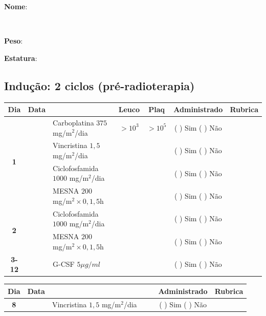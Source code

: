 \documentclass[11pt,a4paper,oldfontcommands]{memoir}
\def\entrywithlabel[#1]#2{\parbox{#1}{{\small #2:} \hrulefill}}
\begin{document}
\pagebreak
    \noindent
\entrywithlabel[1\hsize]{\textbf{Nome}}\hfill
\\[0.3cm]
\entrywithlabel[.45\hsize]{\textbf{Peso}}\hfill  \entrywithlabel[.45\hsize]{\textbf{Estatura}}

\subsection{Indução: 2 ciclos (pré-radioterapia)}
\renewcommand{\arraystretch}{1.5}

\begin{center}
\begin{table}[H]
\begin{tabular}{p{1cm}c|p{5cm}|p{1.5cm}p{1.5cm}|c|c}
	\hline
	\multicolumn{1}{c|}{\multirow{1}{*}{\textbf{Dia}}}&{Data}&{}&\multicolumn{1}{c|}{Leuco}&\multicolumn{1}{c|}{Plaq}&{Administrado}&{Rubrica} \\
    \hline
    \multicolumn{1}{c|}{\multirow{4}{*}{\textbf{1}}}&\multirow{2}{*}{}&{Carboplatina 3\(75\) mg/m\(^2\)/dia}&\multicolumn{1}{c|}{\(>10^3\)}&\multicolumn{1}{c|}{\(>10^5\)}&{(  ) Sim (  ) Não}&\\
    \cline{4-5}
    \multicolumn{1}{c|}{}&&{Vincristina \(1,5\) mg/m\(^2\)/dia}&\multicolumn{1}{c|}{}&&{(  ) Sim (  ) Não}&\\
    \cline{4-5}
    \multicolumn{1}{c|}{}&\multirow{1}{*}{}&{Ciclofosfamida \(1000\) mg/m\(^2\)/dia}&{}&&{(  ) Sim (  ) Não}&\\
    \multicolumn{1}{c|}{}&&{MESNA \(200\) mg/m\(^2 \times 0,1,5\)h}&&&{(  ) Sim (  ) Não}&\\
    \cline{2-3}\cline{6-6}
    \multicolumn{1}{c|}{\multirow{2}{*}{\textbf{2}}}&\multirow{2}{*}{}&{Ciclofosfamida \(1000\) mg/m\(^2\)/dia}&{}&&{(  ) Sim (  ) Não}&\\
    \multicolumn{1}{c|}{}&&{MESNA \(200\) mg/m\(^2 \times 0,1,5\)h}&&&{(  ) Sim (  ) Não}&\\
    \hline
    \multicolumn{1}{c|}{\textbf{3-12}}&&{G-CSF \(5 \mu g/ml\) }&&&{(  ) Sim (  ) Não}&\\
    \hline
\end{tabular}
\end{table}
\begin{table}[H]
\begin{tabular}{p{1cm}c|p{4cm}|p{2cm}p{2cm}|c|c}
	\hline
	\multicolumn{1}{c|}{\multirow{1}{*}{\textbf{Dia}}}&{Data}&{}&{}&&{Administrado}&{Rubrica} \\
    \hline
    \multicolumn{1}{c|}{\textbf{8}}&&{Vincristina \(1,5\) mg/m\(^2\)/dia}&\multicolumn{1}{c}{}&&{(  ) Sim (  ) Não}&\\

\end{tabular}
\end{table}
\end{center}
\end{document}
